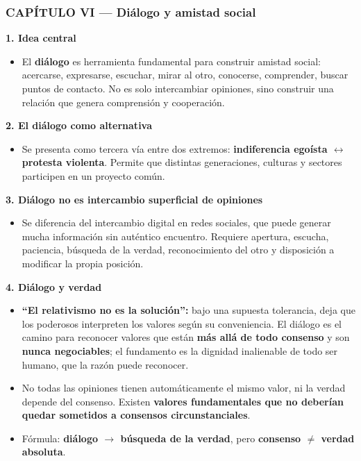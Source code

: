 \documentclass[10pt,a4paper]{article}
\begin{document}
\subsubsection{CAPÍTULO VI --- Diálogo y amistad social}

\medskip\noindent \textbf{1. Idea central}\par\nopagebreak
\begin{itemize}
\item El \textbf{diálogo} es herramienta fundamental para construir amistad social: acercarse, expresarse, escuchar, mirar al otro, conocerse, comprender, buscar puntos de contacto. No es solo intercambiar opiniones, sino construir una relación que genera comprensión y cooperación.
\end{itemize}

\medskip\noindent \textbf{2. El diálogo como alternativa}\par\nopagebreak
\begin{itemize}
\item Se presenta como tercera vía entre dos extremos: \textbf{indiferencia egoísta $\leftrightarrow$ protesta violenta}. Permite que distintas generaciones, culturas y sectores participen en un proyecto común.
\end{itemize}

\medskip\noindent \textbf{3. Diálogo no es intercambio superficial de opiniones}\par\nopagebreak
\begin{itemize}
\item Se diferencia del intercambio digital en redes sociales, que puede generar mucha información sin auténtico encuentro. Requiere apertura, escucha, paciencia, búsqueda de la verdad, reconocimiento del otro y disposición a modificar la propia posición.
\end{itemize}

\medskip\noindent \textbf{4. Diálogo y verdad}\par\nopagebreak
\begin{itemize}
\item \textbf{``El relativismo no es la solución'':} bajo una supuesta tolerancia, deja que los poderosos interpreten los valores según su conveniencia. El diálogo es el camino para reconocer valores que están \textbf{más allá de todo consenso} y son \textbf{nunca negociables}; el fundamento es la dignidad inalienable de todo ser humano, que la razón puede reconocer.
\item No todas las opiniones tienen automáticamente el mismo valor, ni la verdad depende del consenso. Existen \textbf{valores fundamentales que no deberían quedar sometidos a consensos circunstanciales}.
\item Fórmula: \textbf{diálogo $\rightarrow$ búsqueda de la verdad}, pero \textbf{consenso $\neq$ verdad absoluta}.
\end{itemize}
\end{document}
